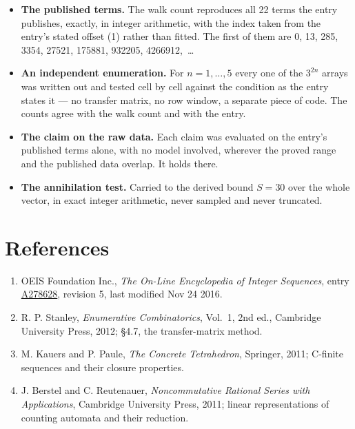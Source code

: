 \documentclass[11pt]{article}
\theoremstyle{definition}
\begin{document}
\begin{itemize}

\item {\bfseries The published terms.} The walk count reproduces all 22 terms the entry publishes, exactly, in integer arithmetic, with the index taken from the entry's stated offset (1) rather than fitted. The first of them are 0, 13, 285, 3354, 27521, 175881, 932205, 4266912,~\dots

\item {\bfseries An independent enumeration.} For $n = 1,\dots,5$ every one of the $3^{2n}$ arrays was written out and tested cell by cell against the condition as the entry states it --- no transfer matrix, no row window, a separate piece of code. The counts agree with the walk count and with the entry.

\item {\bfseries The claim on the raw data.} Each claim was evaluated on the entry's published terms alone, with no model involved, wherever the proved range and the published data overlap. It holds there.

\item {\bfseries The annihilation test.} Carried to the derived bound $S = 30$ over the whole vector, in exact integer arithmetic, never sampled and never truncated.

\end{itemize}

\section{References}

\begin{enumerate}

\item OEIS Foundation Inc., \emph{The On-Line Encyclopedia of Integer Sequences}, entry \href{https://oeis.org/A278628}{A278628}, revision 5, last modified Nov 24 2016.

\item R. P. Stanley, \emph{Enumerative Combinatorics}, Vol.~1, 2nd ed., Cambridge University Press, 2012; \S4.7, the transfer-matrix method.

\item M. Kauers and P. Paule, \emph{The Concrete Tetrahedron}, Springer, 2011; C-finite sequences and their closure properties.

\item J. Berstel and C. Reutenauer, \emph{Noncommutative Rational Series with Applications}, Cambridge University Press, 2011; linear representations of counting automata and their reduction.

\end{enumerate}
\end{document}

